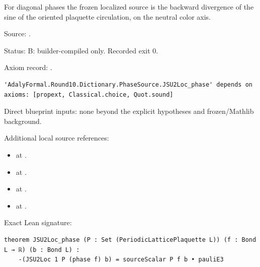 \begin{theorem}[bp-138]
\label{bp-138}
\uses{}
\leanok
For diagonal phases the frozen localized source is the backward divergence of the sine of the oriented plaquette circulation, on the neutral color axis.

\par Source: \texttt{}.
\par Status: B: builder-compiled only. Recorded exit 0.
\par Axiom record: \texttt{}.
\begin{verbatim}
'AdalyFormal.Round10.Dictionary.PhaseSource.JSU2Loc_phase' depends on axioms: [propext, Classical.choice, Quot.sound]
\end{verbatim}
\par Direct blueprint inputs: none beyond the explicit hypotheses and frozen/Mathlib background.
\par Additional local source references:
\begin{itemize}
\item \texttt{} at \texttt{}.
\item \texttt{} at \texttt{}.
\item \texttt{} at \texttt{}.
\item \texttt{} at \texttt{}.
\end{itemize}
\par Exact Lean signature:
\begin{verbatim}
theorem JSU2Loc_phase (P : Set (PeriodicLatticePlaquette L)) (f : Bond L → ℝ) (b : Bond L) :
    -(JSU2Loc 1 P (phase f) b) = sourceScalar P f b • pauliE3
\end{verbatim}
\end{theorem}

